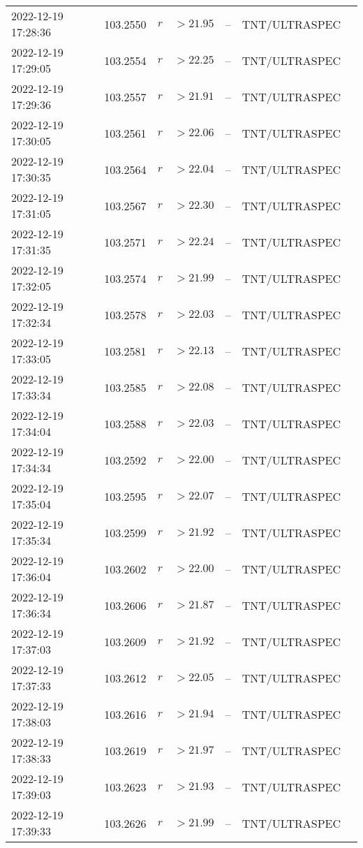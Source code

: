 \documentclass{nature_plusfigure}
\begin{document}
\begin{supplement}
\begin{center}
\begin{longtable}{lllllll}
2022-12-19 17:28:36 & 103.2550 & $r$ & $>21.95$ & -- & TNT/ULTRASPEC &  \\ 
2022-12-19 17:29:05 & 103.2554 & $r$ & $>22.25$ & -- & TNT/ULTRASPEC &  \\ 
2022-12-19 17:29:36 & 103.2557 & $r$ & $>21.91$ & -- & TNT/ULTRASPEC &  \\ 
2022-12-19 17:30:05 & 103.2561 & $r$ & $>22.06$ & -- & TNT/ULTRASPEC &  \\ 
2022-12-19 17:30:35 & 103.2564 & $r$ & $>22.04$ & -- & TNT/ULTRASPEC &  \\ 
2022-12-19 17:31:05 & 103.2567 & $r$ & $>22.30$ & -- & TNT/ULTRASPEC &  \\ 
2022-12-19 17:31:35 & 103.2571 & $r$ & $>22.24$ & -- & TNT/ULTRASPEC &  \\ 
2022-12-19 17:32:05 & 103.2574 & $r$ & $>21.99$ & -- & TNT/ULTRASPEC &  \\ 
2022-12-19 17:32:34 & 103.2578 & $r$ & $>22.03$ & -- & TNT/ULTRASPEC &  \\ 
2022-12-19 17:33:05 & 103.2581 & $r$ & $>22.13$ & -- & TNT/ULTRASPEC &  \\ 
2022-12-19 17:33:34 & 103.2585 & $r$ & $>22.08$ & -- & TNT/ULTRASPEC &  \\ 
2022-12-19 17:34:04 & 103.2588 & $r$ & $>22.03$ & -- & TNT/ULTRASPEC &  \\ 
2022-12-19 17:34:34 & 103.2592 & $r$ & $>22.00$ & -- & TNT/ULTRASPEC &  \\ 
2022-12-19 17:35:04 & 103.2595 & $r$ & $>22.07$ & -- & TNT/ULTRASPEC &  \\ 
2022-12-19 17:35:34 & 103.2599 & $r$ & $>21.92$ & -- & TNT/ULTRASPEC &  \\ 
2022-12-19 17:36:04 & 103.2602 & $r$ & $>22.00$ & -- & TNT/ULTRASPEC &  \\ 
2022-12-19 17:36:34 & 103.2606 & $r$ & $>21.87$ & -- & TNT/ULTRASPEC &  \\ 
2022-12-19 17:37:03 & 103.2609 & $r$ & $>21.92$ & -- & TNT/ULTRASPEC &  \\ 
2022-12-19 17:37:33 & 103.2612 & $r$ & $>22.05$ & -- & TNT/ULTRASPEC &  \\ 
2022-12-19 17:38:03 & 103.2616 & $r$ & $>21.94$ & -- & TNT/ULTRASPEC &  \\ 
2022-12-19 17:38:33 & 103.2619 & $r$ & $>21.97$ & -- & TNT/ULTRASPEC &  \\ 
2022-12-19 17:39:03 & 103.2623 & $r$ & $>21.93$ & -- & TNT/ULTRASPEC &  \\ 
2022-12-19 17:39:33 & 103.2626 & $r$ & $>21.99$ & -- & TNT/ULTRASPEC &  \\ 

\end{longtable}
\end{center}
\end{supplement}
\end{document}
